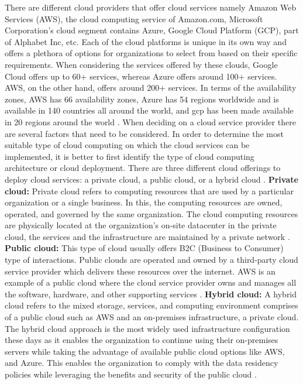 \par There are different cloud providers that offer cloud services namely Amazon Web Services (AWS), the cloud computing service of Amazon.com, Microsoft Corporation’s cloud segment contains Azure, Google Cloud Platform (GCP), part of Alphabet Inc, etc.
Each of the cloud platforms is unique in its own way and offers a plethora of options for organizations to select from based on their specific requirements.
When considering the services offered by these clouds,
Google Cloud offers up to 60+ services, whereas Azure
offers around 100+ services.
AWS, on the other hand, offers around 200+ services.
In terms of the availability zones, AWS has 66
availability zones, Azure has 54 regions worldwide and is
available in 140 countries all around the world, and
\gls{gcp} has been made available in
20 regions around the world \cite{13}.
When deciding on a cloud service provider there are
several factors that need to be considered.
In order to determine the most suitable type of cloud computing on which the cloud services can be implemented, it is better to first identify the type of cloud computing architecture or cloud deployment.
There are three different cloud offerings to deploy cloud services: a private cloud, a public cloud, or a hybrid cloud \cite{14}.
\hfill \break
\textbf{Private cloud:}
Private cloud refers to computing resources that are used by a particular organization or a single business.
In this,
the computing resources are owned, operated, and governed by the same organization.
The cloud
computing resources are physically located at the
organization’s on-site datacenter in the private cloud, the
services
and
the
infrastructure are maintained by a private network \cite{14}.
\hfill \break
\textbf{Public cloud:}
This type of cloud usually offers B2C (Business to Consumer) type of interactions. Public clouds are operated and
owned by a third-party cloud service provider which delivers these resources over the internet. AWS is an example of
a public cloud where the cloud service provider owns and manages all the software, hardware, and other supporting
services \cite{14}.
\hfill \break
\textbf{Hybrid cloud:}
A hybrid cloud refers to the mixed storage, services, and computing environment comprises of a public cloud such as
AWS and an on-premises infrastructure, a private cloud. The hybrid cloud approach is the most widely used infrastructure configuration these days as it enables the organization
to continue using their on-premises servers while taking the advantage of available public cloud options like AWS,
and Azure. This enables the organization to comply with the data residency policies while leveraging the benefits and
security of the public cloud \cite{14}.


